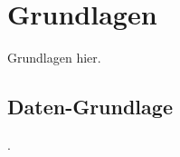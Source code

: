 
\section{Grundlagen}
\label{sec:daten:grundlagen}

Grundlagen hier.

\subsection{Daten-Grundlage}
\label{sec:daten_grundlage}

.
